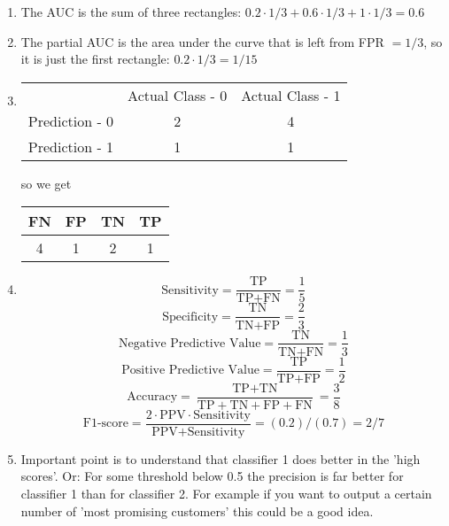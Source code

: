 \documentclass[a4paper]{article}
\begin{document}
{\begin{enumerate}
  \item The AUC is the sum of three rectangles: $0.2 \cdot 1/3 + 0.6 \cdot 1/3 + 
  1\cdot 1/3 = 0.6$
  
  \item The partial AUC is the area under the curve that is left from 
  FPR $= 1/3$, so it is just the first rectangle: $0.2 \cdot 1/3 = 1/15$
  
  \item \phantom{foo}
  \begin{tabular}{ | c | c | c | } \hline
    & Actual Class - 0 & Actual Class - 1  \\
    Prediction - 0 & 2 & 4  \\
    Prediction - 1 & 1 & 1  \\ \hline
  \end{tabular}
  so we get
  \begin{tabular}{ | c | c | c | c | }
    \hline
    FN & FP & TN & TP   \\ \hline
    4 & 1 & 2 & 1 \\ \hline
  \end{tabular}
    
  \item $$\text{Sensitivity} = \frac{\text{TP}}{\text{TP} + \text{FN}} =
  \frac{1}{5} $$
  $$\text{Specificity}  = \frac{\text{TN}}{\text{TN} + \text{FP}} =\frac{2}{3}$$
  $$\text{Negative Predictive Value} = \frac{\text{TN}}{\text{TN} + \text{FN}} =
  \frac{1}{3} $$
  $$\text{Positive Predictive Value} = \frac{\text{TP}}{\text{TP} + \text{FP}} =
  \frac{1}{2} $$
  $$\text{Accuracy} = \frac{\text{TP} + \text{TN}}{\text{TP} + \text{TN} + 
  \text{FP} + \text{FN}} =\frac{3}{8} $$
  $$\text{F1-score} = \frac{2\cdot\text{PPV}\cdot\text{Sensitivity}}{\text{PPV}
  +\text{Sensitivity}} = (0.2) / (0.7) = 2/7  $$
  
  \item Important point is to understand that classifier 1 does better in the
  'high scores'. Or: For some threshold below 0.5 the precision is far better
  for classifier 1 than for classifier 2. For example if you want to output a
  certain number of 'most promising customers' this could be a good idea.

\end{enumerate}
}

\end{document}
